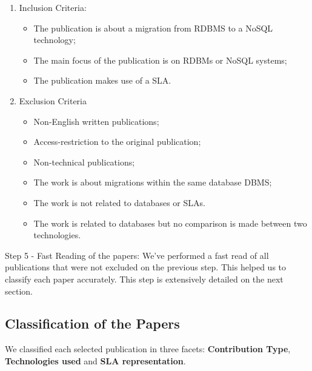 \documentclass{article}
\begin{document}
\begin{enumerate}
    \item Inclusion Criteria: 
    \begin{itemize}
      \item The publication is about a migration from RDBMS to a NoSQL technology;
      \item The main focus of the publication is on RDBMs or NoSQL systems;
      \item The publication makes use of a SLA.
    \end{itemize}
    \item Exclusion Criteria
	\begin{itemize}
    \item Non-English written publications;
		\item Access-restriction to the original publication;
		\item Non-technical publications;
    \item The work is about migrations within the same database DBMS;
    \item The work is not related to databases or SLAs.
    \item The work is related to databases but no comparison is made between two technologies.
    \end{itemize}
    
\end{enumerate}


Step 5 - Fast Reading of the papers: We've performed a fast read of all publications that were not excluded on the previous step. This helped us to classify each paper accurately. This step is extensively detailed on the next section. 


\subsection{Classification of the Papers}

We classified each selected publication in three facets: \textbf{Contribution Type}, \textbf{Technologies used} and \textbf{SLA representation}. 
\end{document}
